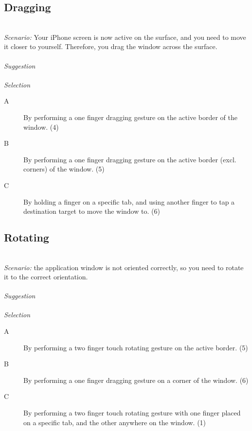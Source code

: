 


\subsection{Dragging}
\hfill\\
\emph{Scenario:}
Your iPhone screen is now active on the surface, and you need to move it closer to yourself. Therefore, you drag the window across the surface.
\\\\
\emph{Suggestion}
\\\\
\emph{Selection}
\begin{description}
\item[A]{By performing a one finger dragging gesture on the active border of the window. (4)}
\item[B]{By performing a one finger dragging gesture on the active border (excl. corners) of the window. (5)}
\item[C]{By holding a finger on a specific tab, and using another finger to tap a destination target to move the window to. (6)}
\end{description}


\subsection{Rotating}
\hfill\\
\emph{Scenario:}
the application window is not oriented correctly, so you need to rotate it to the correct orientation. 
\\\\
\emph{Suggestion}
\\\\
\emph{Selection}
\begin{description}
\item[A]{By performing a two finger touch rotating gesture on the active border. (5)}
\item[B]{By performing a one finger dragging gesture on a corner of the window. (6)}
\item[C]{By performing a two finger touch rotating gesture with one finger placed on a specific tab, and the other anywhere on the window. (1)}
\end{description}


